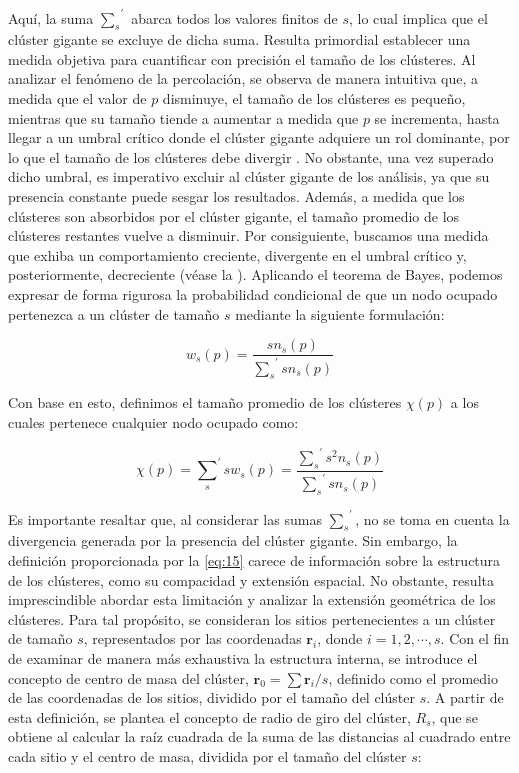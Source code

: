 Aquí, la suma ${\sum_{s}}^{\prime}$ abarca todos los valores finitos de $s$, lo cual implica que el clúster gigante se excluye de dicha suma. Resulta primordial establecer una medida objetiva para cuantificar con precisión el tamaño de los clústeres.  Al analizar el fenómeno de la percolación, se observa de manera intuitiva que, a medida que el valor de $p$ disminuye, el tamaño de los clústeres es pequeño, mientras que su tamaño tiende a aumentar a medida que $p$ se incrementa, hasta llegar a un umbral crítico donde el clúster gigante adquiere un rol dominante, por lo que el tamaño de los clústeres debe divergir \cite{saberi_recent_2015}. No obstante, una vez superado dicho umbral, es imperativo excluir al clúster gigante de los análisis, ya que su presencia constante puede sesgar los resultados. Además, a medida que los clústeres son absorbidos por el clúster gigante, el tamaño promedio de los clústeres restantes vuelve a disminuir. Por consiguiente, buscamos una medida que exhiba un comportamiento creciente, divergente en el umbral crítico y, posteriormente, decreciente (véase la ). Aplicando el teorema de Bayes, podemos expresar de forma rigurosa la probabilidad condicional de que un nodo ocupado pertenezca a un clúster de tamaño $s$ mediante la siguiente formulación:

\begin{equation}\label{eq:14}
w_s(p) = \frac{sn_s(p)}{{\sum_{s}}^{\prime}sn_s(p)}
\end{equation}

Con base en esto, definimos el tamaño promedio de los clústeres $\chi(p)$  a los cuales pertenece cualquier nodo ocupado como:

\begin{equation}\label{eq:15}
\chi(p)={\sum_{s}}^{\prime}{sw_s(p)}=\frac{{\sum_{s}}^{\prime}{s^2n_s(p)}}{{\sum_{s}}^{\prime}{sn_s(p)}}
\end{equation}

Es importante resaltar que, al considerar las sumas ${\sum_{s}}^{\prime}$, no se toma en cuenta la divergencia generada por la presencia del clúster gigante. Sin embargo, la definición proporcionada por la \cref{eq:15} carece de información sobre la estructura de los clústeres, como su compacidad y extensión espacial. No obstante, resulta imprescindible abordar esta limitación y analizar la extensión geométrica de los clústeres. Para tal propósito, se consideran los sitios pertenecientes a un clúster de tamaño $s$, representados por las coordenadas $\mathbf{r}_i$, donde $i = 1, 2,\cdots,s$. Con el fin de examinar de manera más exhaustiva la estructura interna, se introduce el concepto de centro de masa del clúster, $\mathbf{r}_0 = \sum{\mathbf{r}_i}/s$, definido como el promedio de las coordenadas de los sitios, dividido por el tamaño del clúster $s$. A partir de esta definición, se plantea el concepto de radio de giro del clúster, $R_s$, que se obtiene al calcular la raíz cuadrada de la suma de las distancias al cuadrado entre cada sitio y el centro de masa, dividida por el tamaño del clúster $s$:

